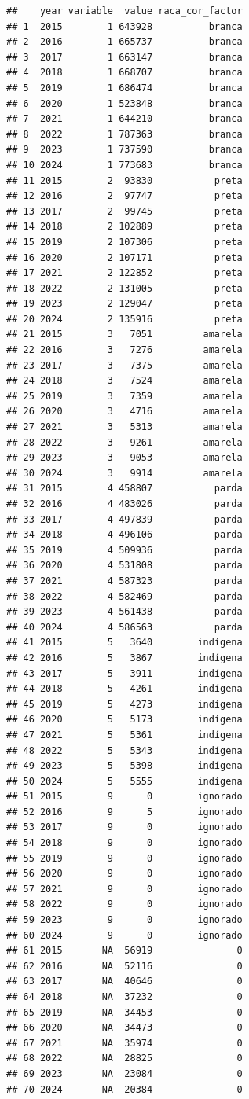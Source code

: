 \documentclass[
]{book}
\begin{document}
\begin{verbatim}
##    year variable  value raca_cor_factor
## 1  2015        1 643928          branca
## 2  2016        1 665737          branca
## 3  2017        1 663147          branca
## 4  2018        1 668707          branca
## 5  2019        1 686474          branca
## 6  2020        1 523848          branca
## 7  2021        1 644210          branca
## 8  2022        1 787363          branca
## 9  2023        1 737590          branca
## 10 2024        1 773683          branca
## 11 2015        2  93830           preta
## 12 2016        2  97747           preta
## 13 2017        2  99745           preta
## 14 2018        2 102889           preta
## 15 2019        2 107306           preta
## 16 2020        2 107171           preta
## 17 2021        2 122852           preta
## 18 2022        2 131005           preta
## 19 2023        2 129047           preta
## 20 2024        2 135916           preta
## 21 2015        3   7051         amarela
## 22 2016        3   7276         amarela
## 23 2017        3   7375         amarela
## 24 2018        3   7524         amarela
## 25 2019        3   7359         amarela
## 26 2020        3   4716         amarela
## 27 2021        3   5313         amarela
## 28 2022        3   9261         amarela
## 29 2023        3   9053         amarela
## 30 2024        3   9914         amarela
## 31 2015        4 458807           parda
## 32 2016        4 483026           parda
## 33 2017        4 497839           parda
## 34 2018        4 496106           parda
## 35 2019        4 509936           parda
## 36 2020        4 531808           parda
## 37 2021        4 587323           parda
## 38 2022        4 582469           parda
## 39 2023        4 561438           parda
## 40 2024        4 586563           parda
## 41 2015        5   3640        indígena
## 42 2016        5   3867        indígena
## 43 2017        5   3911        indígena
## 44 2018        5   4261        indígena
## 45 2019        5   4273        indígena
## 46 2020        5   5173        indígena
## 47 2021        5   5361        indígena
## 48 2022        5   5343        indígena
## 49 2023        5   5398        indígena
## 50 2024        5   5555        indígena
## 51 2015        9      0        ignorado
## 52 2016        9      5        ignorado
## 53 2017        9      0        ignorado
## 54 2018        9      0        ignorado
## 55 2019        9      0        ignorado
## 56 2020        9      0        ignorado
## 57 2021        9      0        ignorado
## 58 2022        9      0        ignorado
## 59 2023        9      0        ignorado
## 60 2024        9      0        ignorado
## 61 2015       NA  56919               0
## 62 2016       NA  52116               0
## 63 2017       NA  40646               0
## 64 2018       NA  37232               0
## 65 2019       NA  34453               0
## 66 2020       NA  34473               0
## 67 2021       NA  35974               0
## 68 2022       NA  28825               0
## 69 2023       NA  23084               0
## 70 2024       NA  20384               0
\end{verbatim}
\end{document}

